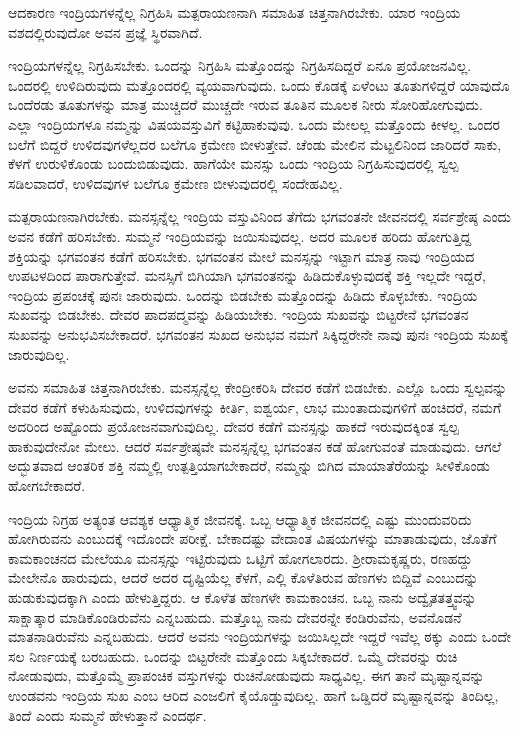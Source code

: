 \begin{artha}
ಆದಕಾರಣ ಇಂದ್ರಿಯಗಳನ್ನೆಲ್ಲ ನಿಗ್ರಹಿಸಿ ಮತ್ಪರಾಯಣನಾಗಿ ಸಮಾಹಿತ ಚಿತ್ತನಾಗಿರಬೇಕು. ಯಾರ ಇಂದ್ರಿಯ ವಶದಲ್ಲಿರುವುದೋ ಅವನ ಪ್ರಜ್ಞೆ ಸ್ಥಿರವಾಗಿದೆ.
\end{artha}

ಇಂದ್ರಿಯಗಳನ್ನೆಲ್ಲ ನಿಗ್ರಹಿಸಬೇಕು. ಒಂದನ್ನು ನಿಗ್ರಹಿಸಿ ಮತ್ತೊಂದನ್ನು ನಿಗ್ರಹಿಸದಿದ್ದರೆ ಏನೂ ಪ್ರಯೋಜನವಿಲ್ಲ. ಒಂದರಲ್ಲಿ ಉಳಿದಿರುವುದು ಮತ್ತೊಂದರಲ್ಲಿ ವ್ಯಯವಾಗುವುದು. ಒಂದು ಕೊಡಕ್ಕೆ ಏಳೆಂಟು ತೂತುಗಳಿದ್ದರೆ ಯಾವುದೊ ಒಂದೆರಡು ತೂತುಗಳನ್ನು ಮಾತ್ರ ಮುಚ್ಚಿದರೆ ಮುಚ್ಚದೇ ಇರುವ ತೂತಿನ ಮೂಲಕ ನೀರು ಸೋರಿಹೋಗುವುದು. ಎಲ್ಲಾ ಇಂದ್ರಿಯಗಳೂ ನಮ್ಮನ್ನು ವಿಷಯವಸ್ತುವಿಗೆ ಕಟ್ಟಿಹಾಕುವುವು. ಒಂದು ಮೇಲಲ್ಲ ಮತ್ತೊಂದು ಕೀಳಲ್ಲ. ಒಂದರ ಬಲೆಗೆ ಬಿದ್ದರೆ ಉಳಿದವುಗಳೆಲ್ಲದರ ಬಲೆಗೂ ಕ್ರಮೇಣ ಬೀಳುತ್ತೇವೆ. ಚೆಂಡು ಮೇಲಿನ ಮೆಟ್ಟಲಿನಿಂದ ಜಾರಿದರೆ ಸಾಕು, ಕೆಳಗೆ ಉರುಳಿಕೊಂಡು ಬಂದುಬಿಡುವುದು. ಹಾಗೆಯೇ ಮನಸ್ಸು ಒಂದು ಇಂದ್ರಿಯ ನಿಗ್ರಹಿಸುವುದರಲ್ಲಿ ಸ್ವಲ್ಪ ಸಡಿಲವಾದರೆ, ಉಳಿದವುಗಳ ಬಲೆಗೂ ಕ್ರಮೇಣ ಬೀಳುವುದರಲ್ಲಿ ಸಂದೇಹವಿಲ್ಲ.

ಮತ್ಪರಾಯಣನಾಗಿರಬೇಕು. ಮನಸ್ಸನ್ನೆಲ್ಲ ಇಂದ್ರಿಯ ವಸ್ತುವಿನಿಂದ ತೆಗೆದು ಭಗವಂತನೇ ಜೀವನದಲ್ಲಿ ಸರ್ವಶ್ರೇಷ್ಠ ಎಂದು ಅವನ ಕಡೆಗೆ ಹರಿಸಬೇಕು. ಸುಮ್ಮನೆ ಇಂದ್ರಿಯವನ್ನು ಜಯಿಸುವುದಲ್ಲ. ಅದರ ಮೂಲಕ ಹರಿದು ಹೋಗುತ್ತಿದ್ದ ಶಕ್ತಿಯನ್ನು ಭಗವಂತನ ಕಡೆಗೆ ಹರಿಸಬೇಕು. ಭಗವಂತನ ಮೇಲೆ ಮನಸ್ಸನ್ನು ಇಟ್ಟಾಗ ಮಾತ್ರ ನಾವು ಇಂದ್ರಿಯದ ಉಪಟಳದಿಂದ ಪಾರಾಗುತ್ತೇವೆ. ಮನಸ್ಸಿಗೆ ಬಿಗಿಯಾಗಿ ಭಗವಂತನನ್ನು ಹಿಡಿದುಕೊಳ್ಳುವುದಕ್ಕೆ ಶಕ್ತಿ ಇಲ್ಲದೇ ಇದ್ದರೆ, ಇಂದ್ರಿಯ ಪ್ರಪಂಚಕ್ಕೆ ಪುನಃ ಜಾರುವುದು. ಒಂದನ್ನು ಬಿಡಬೇಕು ಮತ್ತೊಂದನ್ನು ಹಿಡಿದು ಕೊಳ್ಳಬೇಕು. ಇಂದ್ರಿಯ ಸುಖವನ್ನು ಬಿಡಬೇಕು. ದೇವರ ಪಾದಪದ್ಮವನ್ನು ಹಿಡಿಯಬೇಕು. ಇಂದ್ರಿಯ ಸುಖವನ್ನು ಬಿಟ್ಟರೇನೆ ಭಗವಂತನ ಸುಖವನ್ನು ಅನುಭವಿಸಬೇಕಾದರೆ. ಭಗವಂತನ ಸುಖದ ಅನುಭವ ನಮಗೆ ಸಿಕ್ಕಿದ್ದರೇನೇ ನಾವು ಪುನಃ ಇಂದ್ರಿಯ ಸುಖಕ್ಕೆ ಜಾರುವುದಿಲ್ಲ.

ಅವನು ಸಮಾಹಿತ ಚಿತ್ತನಾಗಿರಬೇಕು. ಮನಸ್ಸನ್ನೆಲ್ಲ ಕೇಂದ್ರೀಕರಿಸಿ ದೇವರ ಕಡೆಗೆ ಬಿಡಬೇಕು. ಎಲ್ಲೊ ಒಂದು ಸ್ವಲ್ಪವನ್ನು ದೇವರ ಕಡೆಗೆ ಕಳುಹಿಸುವುದು, ಉಳಿದವುಗಳನ್ನು ಕೀರ್ತಿ, ಐಶ್ವರ್ಯ, ಲಾಭ ಮುಂತಾದುವುಗಳಿಗೆ ಹಂಚಿದರೆ, ನಮಗೆ ಅದರಿಂದ ಅಷ್ಟೊಂದು ಪ್ರಯೋಜನವಾಗುವುದಿಲ್ಲ. ದೇವರ ಕಡೆಗೆ ಮನಸ್ಸನ್ನು ಹಾಕದೆ ಇರುವುದಕ್ಕಿಂತ ಸ್ವಲ್ಪ ಹಾಕುವುದೇನೋ ಮೇಲು. ಆದರೆ ಸರ್ವಶ್ರೇಷ್ಠವೇ ಮನಸ್ಸನ್ನೆಲ್ಲ ಭಗವಂತನ ಕಡೆ ಹೋಗುವಂತೆ ಮಾಡುವುದು. ಆಗಲೆ ಅದ್ಭುತವಾದ ಆಂತರಿಕ ಶಕ್ತಿ ನಮ್ಮಲ್ಲಿ ಉತ್ಪತ್ತಿಯಾಗಬೇಕಾದರೆ, ನಮ್ಮನ್ನು ಬಿಗಿದ ಮಾಯಾತೆರೆಯನ್ನು ಸೀಳಿಕೊಂಡು ಹೋಗಬೇಕಾದರೆ.

ಇಂದ್ರಿಯ ನಿಗ್ರಹ ಅತ್ಯಂತ ಆವಶ್ಯಕ ಆಧ್ಯಾತ್ಮಿಕ ಜೀವನಕ್ಕೆ. ಒಬ್ಬ ಆಧ್ಯಾತ್ಮಿಕ ಜೀವನದಲ್ಲಿ ಎಷ್ಟು ಮುಂದುವರಿದು ಹೋಗಿರುವನು ಎಂಬುದಕ್ಕೆ ಇದೊಂದೇ ಪರೀಕ್ಷೆ. ಬೇಕಾದಷ್ಟು ವೇದಾಂತ ವಿಷಯಗಳನ್ನು ಮಾತಾಡುವುದು, ಜೊತೆಗೆ ಕಾಮಕಾಂಚನದ ಮೇಲೆಯೂ ಮನಸ್ಸನ್ನು ಇಟ್ಟಿರುವುದು ಒಟ್ಟಿಗೆ ಹೋಗಲಾರದು. ಶ‍್ರೀರಾಮಕೃಷ್ಣರು, ರಣಹದ್ದು ಮೇಲೇನೊ ಹಾರುವುದು, ಆದರೆ ಅದರ ದೃಷ್ಟಿಯೆಲ್ಲ ಕೆಳಗೆ, ಎಲ್ಲಿ ಕೊಳೆತಿರುವ ಹೆಣಗಳು ಬಿದ್ದಿವೆ ಎಂಬುದನ್ನು ಹುಡುಕುವುದಕ್ಕಾಗಿ ಎಂದು ಹೇಳುತ್ತಿದ್ದರು. ಆ ಕೊಳೆತ ಹೆಣಗಳೇ ಕಾಮಕಾಂಚನ. ಒಬ್ಬ ನಾನು ಅದ್ವೈತತತ್ತ್ವವನ್ನು ಸಾಕ್ಷಾತ್ಕಾರ ಮಾಡಿಕೊಂಡಿರುವೆನು ಎನ್ನಬಹುದು. ಮತ್ತೊಬ್ಬ ನಾನು ದೇವರನ್ನೇ ಕಂಡಿರುವೆನು, ಅವನೊಡನೆ ಮಾತನಾಡಿರುವೆನು ಎನ್ನಬಹುದು. ಆದರೆ ಅವನು ಇಂದ್ರಿಯಗಳನ್ನು ಜಯಿಸಿಲ್ಲದೇ ಇದ್ದರೆ ಇವೆಲ್ಲ ಠಕ್ಕು ಎಂದು ಒಂದೇ ಸಲ ನಿರ್ಣಯಕ್ಕೆ ಬರಬಹುದು. ಒಂದನ್ನು ಬಿಟ್ಟರೇನೇ ಮತ್ತೊಂದು ಸಿಕ್ಕಬೇಕಾದರೆ. ಒಮ್ಮೆ ದೇವರನ್ನು ರುಚಿ ನೋಡುವುದು, ಮತ್ತೊಮ್ಮೆ ಪ್ರಾಪಂಚಿಕ ವಸ್ತುಗಳನ್ನು ರುಚಿನೋಡುವುದು ಸಾಧ್ಯವಿಲ್ಲ. ಈಗ ತಾನೆ ಮೃಷ್ಟಾನ್ನವನ್ನು ಉಂಡವನು ಇಂದ್ರಿಯ ಸುಖ ಎಂಬ ಆರಿದ ಎಂಜಲಿಗೆ ಕೈಯೊಡ್ಡುವುದಿಲ್ಲ. ಹಾಗೆ ಒಡ್ಡಿದರೆ ಮೃಷ್ಟಾನ್ನವನ್ನು ತಿಂದಿಲ್ಲ, ತಿಂದೆ ಎಂದು ಸುಮ್ಮನೆ ಹೇಳುತ್ತಾನೆ ಎಂದರ್ಥ.

